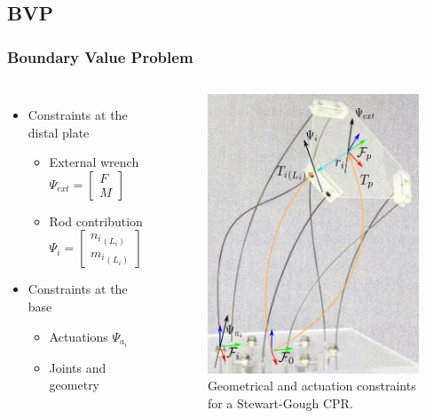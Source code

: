 \documentclass[compress]{thesisbeamer}
\begin{document}
        \subsection{BVP}
        \begin{frame}
        	\frametitle{Boundary Value Problem}
			\begin{columns}
			\begin{itemize}%
  				\item Constraints at the distal plate
  				\begin{itemize}%
   					\item External wrench $ \Psi_{ext} = \begin{bmatrix} F \\ M \end{bmatrix}   					 $
   					\item Rod contribution $ \Psi_{i} = \begin{bmatrix} {n_i}_{(L_i)} \\ {m_i}_{(L_i)} \end{bmatrix}   					 $
  				\end{itemize}
  				\item Constraints at the base 
  				\begin{itemize}%
   					\item Actuations $ \Psi_{a_i}$
   					\item Joints and geometry 
  				\end{itemize}
 			\end{itemize}
			\vspace{2cm}
			\begin{figure}[h]
				\centering
				\includegraphics[height=0.7\textheight]{images/BVP}
				\caption{Geometrical and actuation constraints for a Stewart-Gough CPR.}
			\end{figure}
			\end{columns}
		\end{frame}
		
\end{document}
